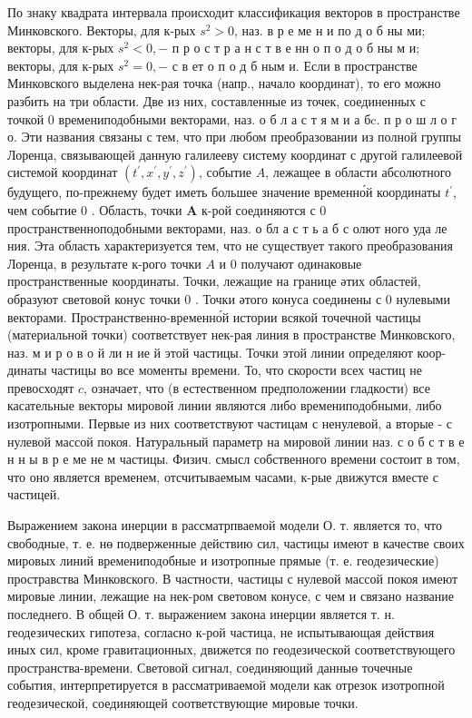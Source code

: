 \documentclass[10pt]{article}
\begin{document}
По знаку квадрата интервала происходит классификация векторов в пространстве Минковского. Векторы, для к-рых $s^{2}>0$, наз. в р е ме н и по д о б ны ми; векторы, для к-рых $s^{2}<0,-$ п р о с т р а н с т в е нн о п о д о б ны м и; векторы, для к-рых $s^{2}=0,-$ с в ет о п о д б ным и. Если в пространстве Минковского выделена нек-рая точка (напр., начало координат), то его можно разбить на три области. Две из них, составленные из точек, соединенных с точкой 0 времениподобными векторами, наз. о б л а с т я м и а бc. п р о ш л о г о. Эти названия связаны с тем, что при любом преобразовании из полной группы Лоренца, связывающей данную галилееву систему координат с другой галилеевой системой координат $\left(t^{\prime}, x^{\prime}, y^{\prime}, z^{\prime}\right)$, событие $A$, лежащее в области абсолютного будущего, по-прежнему будет иметь большее значение временно́й координаты $t^{\prime}$, чем событие 0 . Область, точки $\boldsymbol{A}$ к-рой соединяются с 0 пространственноподобными векторами, наз. о бл а с т ь а б с олют ного уда ле ния. Эта область характеризуется тем, что не существует такого преобразования Лоренца, в результате к-рого точки $A$ и 0 получают одинаковые пространственные координаты. Точки, лежащие на границе әтих областей, образуют световой конус точки 0 . Точки әтого конуса соединены с 0 нулевыми векторами. Пространственно-временно́й истории всякой точечной частицы (материальной точки) соответствует нек-рая линия в пространстве Минковского, наз. м и р о в о й ли н ие й этой частицы. Точки этой линии определяют коор- динаты частицы во все моменты времени. То, что скорости всех частиц не превосходят $c$, означает, что (в естественном предположении гладкости) все касательные векторы мировой линии являются либо времениподобными, либо изотропными. Первые из них соответствуют частицам с ненулевой, а вторые - с нулевой массой покоя. Натуральный параметр на мировой линии наз. с о б с т в е н н ы в р е ме не м частицы. Физич. смысл собственного времени состоит в том, что оно является временем, отсчитываемым часами, к-рые движутся вместе с частицей.

Выражением закона инерции в рассматрпваемой модели О. т. является то, что свободные, т. е. нө подверженные действию сил, частицы имеют в качестве своих мировых линий времениподобные и изотропные прямые (т. е. геодезические) простравства Минковского. В частности, частицы с нулевой массой покоя имеют мировые линии, лежащие на нек-ром световом конусе, с чем и связано название последнего. В общей О. т. выражением закона инерции является т. н. геодезических гипотеза, согласно к-рой частица, не испытывающая действия иных сил, кроме гравитационных, движется по геодезической соответствующего пространства-времени. Световой сигнал, соединяющий данныө точечные события, интерпретируется в рассматриваемой модели как отрезок изотропной геодезической, соединяющей соответствующие мировые точки.
\end{document}
